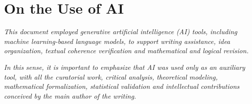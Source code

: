 
\section{On the Use of AI}

\textit{This document employed generative artificial intelligence (AI) tools, including machine learning-based language models, to support writing assistance, idea organization, textual coherence verification and mathematical and logical revision.}
\newline

\noindent\textit{In this sense, it is important to emphasize that AI was used only as an auxiliary tool, with all the curatorial work, critical analysis, theoretical modeling, mathematical formalization, statistical validation and intellectual contributions conceived by the main author of the writing.}

